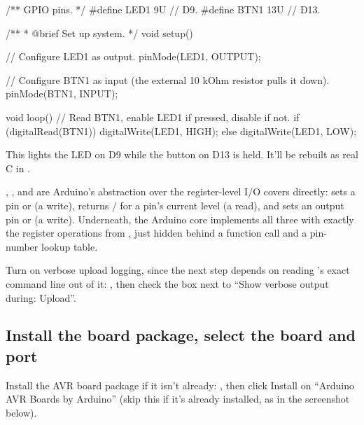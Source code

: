 \begin{cppcode}
/** GPIO pins. */
#define LED1 9U  // D9.
#define BTN1 13U // D13.

/**
 * @brief Set up system.
 */
void setup()
{
    // Configure LED1 as output.
    pinMode(LED1, OUTPUT);

    // Configure BTN1 as input (the external 10 kOhm resistor pulls it down).
    pinMode(BTN1, INPUT);
}

void loop()
{
    // Read BTN1, enable LED1 if pressed, disable if not.
    if (digitalRead(BTN1)) { digitalWrite(LED1, HIGH); }
    else { digitalWrite(LED1, LOW); }
}
\end{cppcode}

\noindent This lights the LED on D9 while the button on D13 is held. It'll be rebuilt as real C in
.

, , and  are Arduino's abstraction over
the register-level I/O  covers directly:  sets a pin
 or  (a  write),  returns
/ for a pin's current level (a  read), and
 sets an output pin  or  (a  write).
Underneath, the Arduino core implements all three with exactly the register operations from
, just hidden behind a function call and a pin-number lookup table.

Turn on verbose upload logging, since the next step depends on reading 's exact
command line out of it: , then check the box next to ``Show verbose output
during: Upload''.



\subsection{Install the board package, select the board and port}
\label{c2:c:4}
Install the AVR board package if it isn't already: , then click
Install on ``Arduino AVR Boards by Arduino'' (skip this if it's already installed, as in the
screenshot below).

